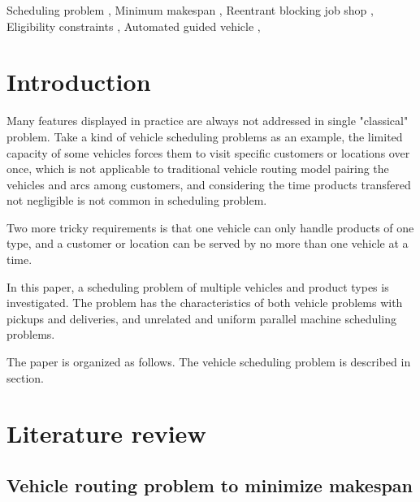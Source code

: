 \documentclass[preprint,12pt,authoryear]{elsarticle}
\begin{document}
\begin{frontmatter}
\begin{keyword}
    Scheduling problem \sep
    Minimum makespan \sep
    Reentrant blocking job shop \sep
    Eligibility constraints \sep
    Automated guided vehicle \sep



\end{keyword}

\end{frontmatter}


\section{Introduction}

Many features displayed in practice are always 
not addressed in single "classical" problem.
Take a kind of vehicle scheduling problems as an example, 
the limited capacity of some vehicles forces them to visit 
specific customers or locations over once, which is not applicable to
traditional vehicle routing model pairing the vehicles 
and arcs among customers, 
and considering the time products transfered not negligible
is not common in scheduling problem. 


Two more tricky requirements is that
one vehicle can only handle products of one type, 
and a customer or location 
can be served by no more than one vehicle at a time.

In this paper, a scheduling problem of multiple vehicles and product types is investigated. 
The problem has the  characteristics of both vehicle problems with pickups and deliveries,
and unrelated and uniform parallel machine scheduling problems.


The paper is organized as follows. The vehicle scheduling problem is described in section. 

\section{Literature review}

\subsection{Vehicle routing problem to minimize makespan}
\end{document}
